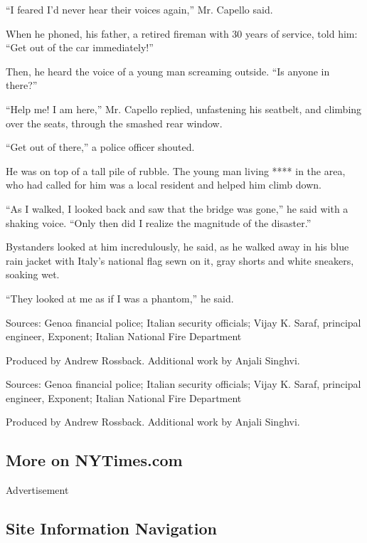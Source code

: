 ``I feared I'd never hear their voices again,'' Mr. Capello said.

When he phoned, his father, a retired fireman with 30 years of service,
told him: ``Get out of the car immediately!''

Then, he heard the voice of a young man screaming outside. ``Is anyone
in there?''

``Help me! I am here,'' Mr. Capello replied, unfastening his seatbelt,
and climbing over the seats, through the smashed rear window.

``Get out of there,'' a police officer shouted.

He was on top of a tall pile of rubble. The young man living **** in the
area, who had called for him was a local resident and helped him climb
down.

``As I walked, I looked back and saw that the bridge was gone,'' he said
with a shaking voice. ``Only then did I realize the magnitude of the
disaster.''

Bystanders looked at him incredulously, he said, as he walked away in
his blue rain jacket with Italy's national flag sewn on it, gray shorts
and white sneakers, soaking wet.

``They looked at me as if I was a phantom,'' he said.

Sources: Genoa financial police; Italian security officials; Vijay K.
Saraf, principal engineer, Exponent; Italian National Fire Department

Produced by Andrew Rossback. Additional work by Anjali Singhvi.

Sources: Genoa financial police; Italian security officials; Vijay K.
Saraf, principal engineer, Exponent; Italian National Fire Department

Produced by Andrew Rossback. Additional work by Anjali Singhvi.

\hypertarget{more-on-nytimescom}{%
\subsection{More on NYTimes.com}\label{more-on-nytimescom}}

Advertisement

\hypertarget{site-information-navigation}{%
\subsection{Site Information
Navigation}\label{site-information-navigation}}

